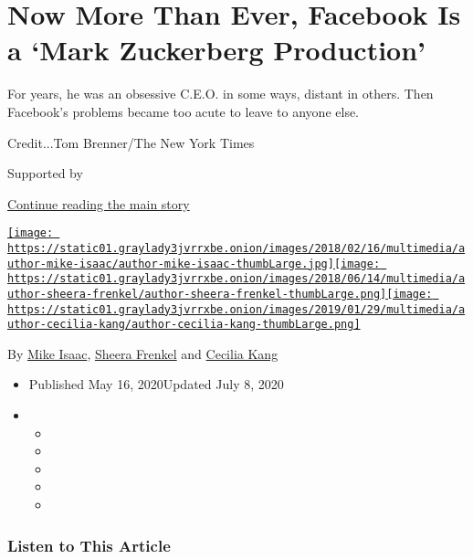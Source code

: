 \hypertarget{now-more-than-ever-facebook-is-a-mark-zuckerberg-production}{%
\section{Now More Than Ever, Facebook Is a `Mark Zuckerberg
Production'}\label{now-more-than-ever-facebook-is-a-mark-zuckerberg-production}}

For years, he was an obsessive C.E.O. in some ways, distant in others.
Then Facebook's problems became too acute to leave to anyone else.

Credit...Tom Brenner/The New York Times

Supported by

\protect\hyperlink{after-sponsor}{Continue reading the main story}

\href{https://www.nytimes3xbfgragh.onion/by/mike-isaac}{\texttt{[image: https://static01.graylady3jvrrxbe.onion/images/2018/02/16/multimedia/author-mike-isaac/author-mike-isaac-thumbLarge.jpg]}}\href{https://www.nytimes3xbfgragh.onion/by/sheera-frenkel}{\texttt{[image: https://static01.graylady3jvrrxbe.onion/images/2018/06/14/multimedia/author-sheera-frenkel/author-sheera-frenkel-thumbLarge.png]}}\href{https://www.nytimes3xbfgragh.onion/by/cecilia-kang}{\texttt{[image: https://static01.graylady3jvrrxbe.onion/images/2019/01/29/multimedia/author-cecilia-kang/author-cecilia-kang-thumbLarge.png]}}

By \href{https://www.nytimes3xbfgragh.onion/by/mike-isaac}{Mike Isaac},
\href{https://www.nytimes3xbfgragh.onion/by/sheera-frenkel}{Sheera
Frenkel} and
\href{https://www.nytimes3xbfgragh.onion/by/cecilia-kang}{Cecilia Kang}

\begin{itemize}
\item
  Published May 16, 2020Updated July 8, 2020
\item
  \begin{itemize}
  \item
  \item
  \item
  \item
  \item
  \end{itemize}
\end{itemize}

\hypertarget{listen-to-this-article}{%
\subsubsection{Listen to This Article}\label{listen-to-this-article}}

